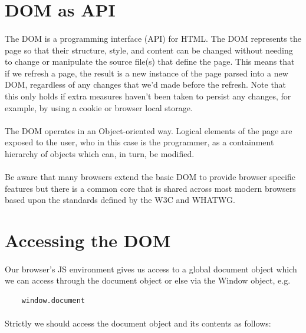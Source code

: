 \section{DOM as API}
\paragraph{} The DOM is a programming interface (API) for HTML. The DOM represents the page so that their structure, style, and content can be changed without needing to change or manipulate the source file(s) that define the page. This means that if we refresh a page, the result is a new instance of the page parsed into a new DOM, regardless of any changes that we'd made before the refresh. Note that this only holds if extra measures haven't been taken to persist any changes, for example, by using a cookie or browser local storage.
\paragraph{} The DOM operates in an Object-oriented way. Logical elements of the page are exposed to the user, who in this case is the programmer, as a containment hierarchy of objects which can, in turn, be modified.
\paragraph{} Be aware that many browsers extend the basic DOM to provide browser specific features but there is a common core that is shared across most modern browsers based upon the standards defined by the W3C and WHATWG.


\section{Accessing the DOM}
\paragraph{} Our browser’s JS environment gives us access to a global document object which we can access through the document object or else via the Window object, e.g. 

\begin{lstlisting}
	window.document
\end{lstlisting}

\paragraph{} Strictly we should access the document object and its contents as follows:

